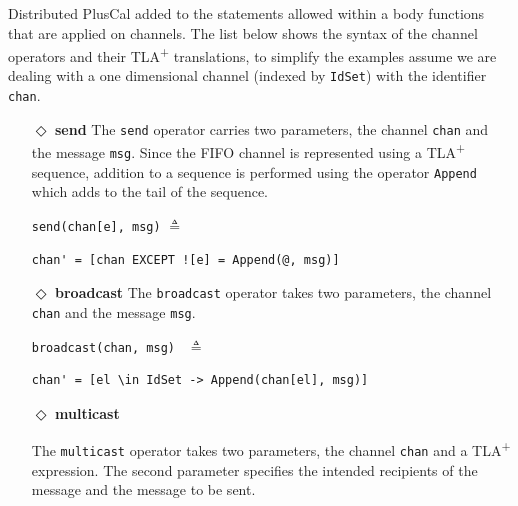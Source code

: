 \documentclass{thesul}
\newcommand{\tlaplus}{TLA\textsuperscript{+}\xspace}
\begin{document}
Distributed PlusCal added to the statements allowed within a body functions that are applied on channels.
The list below shows the syntax of the channel operators and their \tlaplus translations, to simplify the examples assume we are dealing with a one dimensional channel (indexed by \verb|IdSet|) with the identifier \verb|chan|.

\begin{itemize}

\item[$\Diamond$]  \textbf{send} The \verb|send| operator carries two parameters, the channel \verb|chan| and the message \verb|msg|. Since the FIFO channel is represented using a \tlaplus sequence, addition to a sequence is performed using the operator \verb|Append| which adds to the tail of the sequence.

\begin{minipage}{.25\textwidth}

\lstinline|send(chan[e], msg)| $\triangleq$
\end{minipage}\hfill
\begin{minipage}{\textwidth}
\begin{lstlisting}[frame = none, numbers = none]
chan' = [chan EXCEPT ![e] = Append(@, msg)]
\end{lstlisting}

\end{minipage}\hfill

\item[$\Diamond$]  \textbf{broadcast}
The \verb|broadcast| operator takes two parameters, the channel \verb|chan| and the message \verb|msg|.

\begin{minipage}{.25\textwidth}

\lstinline|broadcast(chan, msg) | $\triangleq$
\end{minipage}\hfill
\begin{minipage}{.7\textwidth}
\begin{lstlisting}[frame = none, numbers = none]
chan' = [el \in IdSet -> Append(chan[el], msg)]
\end{lstlisting}

\end{minipage}\hfill

\item[$\Diamond$] \textbf{multicast}

The \verb|multicast| operator takes two parameters, the channel \verb|chan| and a \tlaplus expression. The second parameter specifies the intended recipients of the message and the message to be sent. 


\end{itemize}
\end{document}
